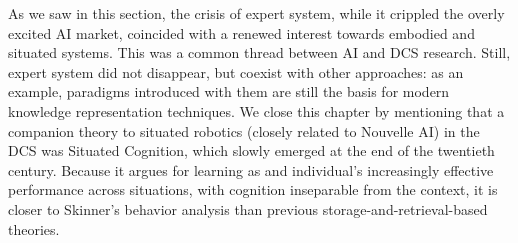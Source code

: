 \documentclass[../main.tex]{subfiles}
\begin{document}
\vspace{5pt}
As we saw in this section, the crisis of expert system, while it crippled the overly excited AI market, coincided with a renewed interest towards embodied and situated systems. This was a common thread between AI and DCS research. Still, expert system did not disappear, but coexist with other approaches: as an example, paradigms introduced with them are still the basis for modern knowledge representation techniques. We close this chapter by mentioning that a companion theory to situated robotics (closely related to Nouvelle AI) in the DCS was Situated Cognition, which slowly emerged at the end of the twentieth century. Because it argues for learning as and individual's increasingly effective performance across situations, with cognition inseparable from the context, it is closer to Skinner's behavior analysis than previous storage-and-retrieval-based theories.
\end{document}
